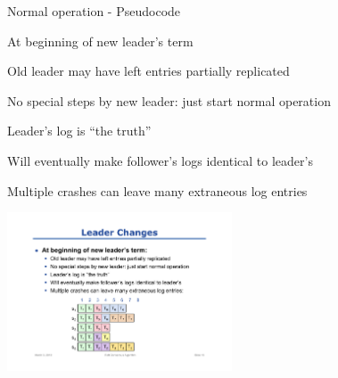 \begin{frame}[shrink=5]{Normal operation - Pseudocode}

\begin{Procedure}
\caption{Normal operation code - executed by process $p$}
\end{Procedure}
\end{frame}

\begin{frame}{At beginning of new leader's term}

\BI
\item Old leader may have left entries partially replicated
\item No special steps by new leader: just start normal operation
\item Leader's log is “the truth”
\item Will eventually make follower's logs identical to leader's
\item Multiple crashes can leave many extraneous log entries
\EI

\begin{center}
\includegraphics[width=0.5\textwidth]{leader-changes}
\end{center}

\end{frame}


